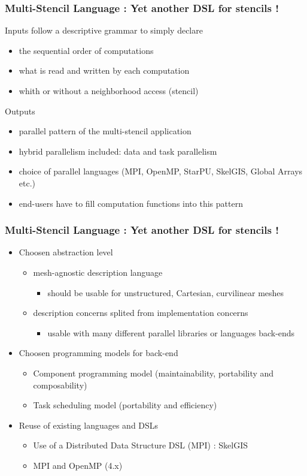 \documentclass{beamer}
\begin{document}
\begin{frame}
\frametitle{Multi-Stencil Language : Yet another DSL for stencils !}
\begin{block}{Inputs}
follow a descriptive grammar to simply declare
\begin{itemize}
\item the sequential order of computations
\item what is read and written by each computation
\item whith or without a neighborhood access (stencil)
\end{itemize}
\end{block}
\begin{block}{Outputs}
\begin{itemize}
\item parallel pattern of the multi-stencil application
\item hybrid parallelism included: data and task parallelism
\item choice of parallel languages (MPI, OpenMP, StarPU, SkelGIS, Global Arrays etc.)
\item end-users have to fill computation functions into this pattern
\end{itemize}
\end{block}
\end{frame}
\begin{frame}
\frametitle{Multi-Stencil Language : Yet another DSL for stencils !}
\begin{itemize}
\item Choosen abstraction level
\begin{itemize}
\item mesh-agnostic description language
\begin{itemize}
\item should be usable for unstructured, Cartesian, curvilinear meshes
\end{itemize}
\item description concerns splited from implementation concerns
\begin{itemize}
\item usable with many different parallel libraries or languages back-ends
\end{itemize}
\end{itemize}
\item Choosen programming models for back-end
\begin{itemize}
\item Component programming model (maintainability, portability and composability)
\item Task scheduling model (portability and efficiency)
\end{itemize}
\item Reuse of existing languages and DSLs
\begin{itemize}
\item Use of a Distributed Data Structure DSL (MPI) : SkelGIS
\item MPI and OpenMP (4.x)
\end{itemize}
\end{itemize}
\end{frame}
\end{document}
